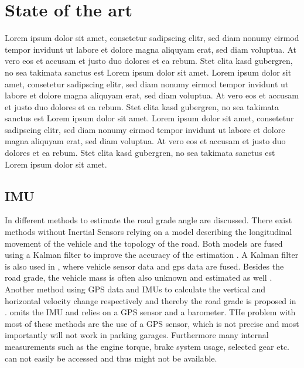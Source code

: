 \chapter{State of the art}
\label{ch:StateOfTheArt}
Lorem ipsum dolor sit amet, consetetur sadipscing elitr, sed diam nonumy eirmod tempor invidunt ut labore et dolore magna aliquyam erat, sed diam voluptua.
At vero eos et accusam et justo duo dolores et ea rebum. Stet clita kasd gubergren, no sea takimata sanctus est Lorem ipsum dolor sit amet.
Lorem ipsum dolor sit amet, consetetur sadipscing elitr, sed diam nonumy eirmod tempor invidunt ut labore et dolore magna aliquyam erat, sed diam voluptua.
At vero eos et accusam et justo duo dolores et ea rebum. Stet clita kasd gubergren, no sea takimata sanctus est Lorem ipsum dolor sit amet.
Lorem ipsum dolor sit amet, consetetur sadipscing elitr, sed diam nonumy eirmod tempor invidunt ut labore et dolore magna aliquyam erat, sed diam voluptua.
At vero eos et accusam et justo duo dolores et ea rebum. Stet clita kasd gubergren, no sea takimata sanctus est Lorem ipsum dolor sit amet.

\section{IMU}
In \cite{Jauch2018} different methods to estimate the road grade angle are discussed.
There exist methods without Inertial Sensors relying on a model describing the longitudinal movement of the vehicle and the topology of the road.
Both models are fused using a Kalman filter to improve the accuracy of the estimation \cite{SAHLHOLM200755}.
A Kalman filter is also used in \cite{Sahlholm2010}, where vehicle sensor data and \gls{gps} data are fused.
Besides the road grade, the vehicle mass is often also unknown and estimated as well \cite{Sahlholm2010,Maleej2015}.
Another method using GPS data and IMUs to calculate the vertical and horizontal velocity change respectively and thereby the road grade is proposed in \cite{Ryu2004}.
\cite{YazdaniBoroujeni2014} omits the IMU and relies on a GPS sensor and a barometer.
THe problem with most of these methods are the use of a GPS sensor, which is not precise  and most importantly will not work in parking garages.
Furthermore many internal measurements such as the engine torque, brake system usage, selected gear etc. can not easily be accessed and thus might not be available.

